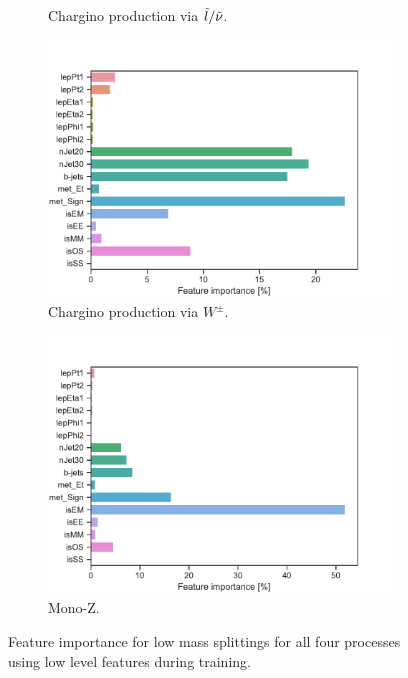 \begin{figure}[H]
\begin{subfigure}[t!]{0.49\textwidth}
        \caption{Chargino production via $\Tilde{l}/\Tilde{\nu}$.}
        \label{fig:}
    \end{subfigure}
    \begin{subfigure}[t!]{0.49\textwidth}
        \includegraphics[width = \textwidth]{Figures/WW/BDT/Low_level/Inter/featureImportance.pdf}
        \caption{Chargino production via $W^\pm$.}
        \label{fig:}
    \end{subfigure}
    \begin{subfigure}[t!]{0.49\textwidth}
        \includegraphics[width = \textwidth]{Figures/Mono_Z/ML/BDT/Low_level/Inter/featureImportance.pdf}
        \caption{Mono-Z.}
        \label{fig:}
    \end{subfigure}
    \caption{Feature importance for low mass splittings for all four processes using low level features during training.}
    \label{fig:Non}
\end{figure}

